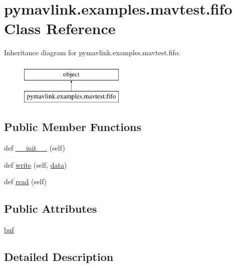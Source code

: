 \hypertarget{classpymavlink_1_1examples_1_1mavtest_1_1fifo}{}\section{pymavlink.\+examples.\+mavtest.\+fifo Class Reference}
\label{classpymavlink_1_1examples_1_1mavtest_1_1fifo}
Inheritance diagram for pymavlink.\+examples.\+mavtest.\+fifo\+:\begin{figure}[H]
\begin{center}
\leavevmode
\includegraphics[height=2.000000cm]{classpymavlink_1_1examples_1_1mavtest_1_1fifo}
\end{center}
\end{figure}
\subsection*{Public Member Functions}
\begin{DoxyCompactItemize}
\item 
def \mbox{\hyperlink{classpymavlink_1_1examples_1_1mavtest_1_1fifo_a6db7ec373a08745bb51fdd54cef6c60e}{\+\_\+\+\_\+init\+\_\+\+\_\+}} (self)
\item 
def \mbox{\hyperlink{classpymavlink_1_1examples_1_1mavtest_1_1fifo_a88329c0b05c02157f63f92b6a279d2d4}{write}} (self, \mbox{\hyperlink{structdata}{data}})
\item 
def \mbox{\hyperlink{classpymavlink_1_1examples_1_1mavtest_1_1fifo_ab683588c70db38e0fc2fd97780d1f063}{read}} (self)
\end{DoxyCompactItemize}
\subsection*{Public Attributes}
\begin{DoxyCompactItemize}
\item 
\mbox{\hyperlink{classpymavlink_1_1examples_1_1mavtest_1_1fifo_a6344690e21814b0d91f6f52c0dd4d27c}{buf}}
\end{DoxyCompactItemize}


\subsection{Detailed Description}


